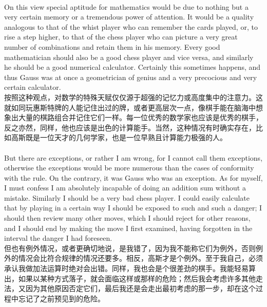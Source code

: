 \documentclass{article}
\begin{document}
\\
On this view special aptitude for mathematics would be due to nothing but a very certain memory or a tremendous power of attention. It would be a quality analogous to that of the whist player who can remember the cards played, or, to rise a step higher, to that of the chess player who can picture a very great number of combinations and retain them in his memory. Every good mathematician should also be a good chess player and vice versa, and similarly he should be a good numerical calculator. Certainly this sometimes happens, and thus Gauss was at once a geometrician of genius and a very precocious and very certain calculator.\\
按照这种观点，对数学的特殊天赋仅仅源于超强的记忆力或高度集中的注意力。这就如同玩惠斯特牌的人能记住出过的牌，或者更高层次一点，像棋手能在脑海中想象出大量的棋路组合并记住它们一样。每一位优秀的数学家也应该是优秀的棋手，反之亦然，同样，他也应该是出色的计算能手。当然，这种情况有时确实存在，比如高斯既是一位天才的几何学家，也是一位早熟且计算能力极强的人。 \\

\\
But there are exceptions, or rather I am wrong, for I cannot call them exceptions, otherwise the exceptions would be more numerous than the cases of conformity with the rule. On the contrary, it was Gauss who was an exception. As for myself, I must confess I am absolutely incapable of doing an addition sum without a mistake. Similarly I should be a very bad chess player. I could easily calculate that by playing in a certain way I should be exposed to such and such a danger; I should then review many other moves, which I should reject for other reasons, and I should end by making the move I first examined, having forgotten in the interval the danger I had foreseen.\\
但也有例外情况，或者更确切地说，是我错了，因为我不能称它们为例外，否则例外的情况会比符合规律的情况还要多。相反，高斯才是个例外。至于我自己，必须承认我做加法运算时绝对会出错。同样，我也会是个很差劲的棋手。我能轻易算出，如果以某种方式落子，就会面临这样或那样的危险；然后我会考虑许多其他走法，又因为其他原因否定它们，最后我还是会走出最初考虑的那一步，却在这个过程中忘记了之前预见到的危险。 \\
\end{document}
